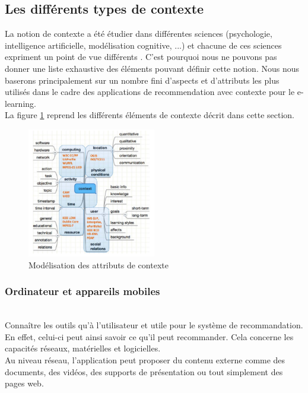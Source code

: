 \documentclass[conference]{./sty/IEEEtran}
\begin{document}
\subsection{Les différents types de contexte}

La notion de contexte a été étudier dans différentes sciences (psychologie,
intelligence artificielle, modélisation cognitive, ...) et chacune de ces
sciences expriment un point de vue différents
\cite{DBLP:reference/rsh/AdomaviciusT11}. C'est pourquoi nous ne pouvons pas
donner une liste exhaustive des éléments pouvant définir cette notion. Nous
nous baserons principalement sur un nombre fini d'aspects et d'attributs les
plus utilisés dans le cadre des applications de recommendation avec contexte
pour le e-learning. \\

La figure \ref{fig:context} reprend les différents éléments de contexte décrit dans cette section. \\

\begin{figure}[tb]
  \centering
  \caption{\label{fig:context} Modélisation des attributs de contexte \cite{DBLP:journals/tlt/VerbertMOWDBD12}}
  \includegraphics[width=0.5\textwidth]{context}
\end{figure}

\subsubsection{Ordinateur et appareils mobiles}
~\\
Connaître les outils qu'à l'utilisateur et utile pour le système de
recommandation. En effet, celui-ci peut ainsi savoir ce qu'il peut recommander.
Cela concerne les capacités réseaux, matérielles et logicielles. \\

Au niveau réseau, l'application peut proposer du contenu externe comme des
documents, des vidéos, des supports de présentation ou tout simplement des
pages web. \\
\end{document}
